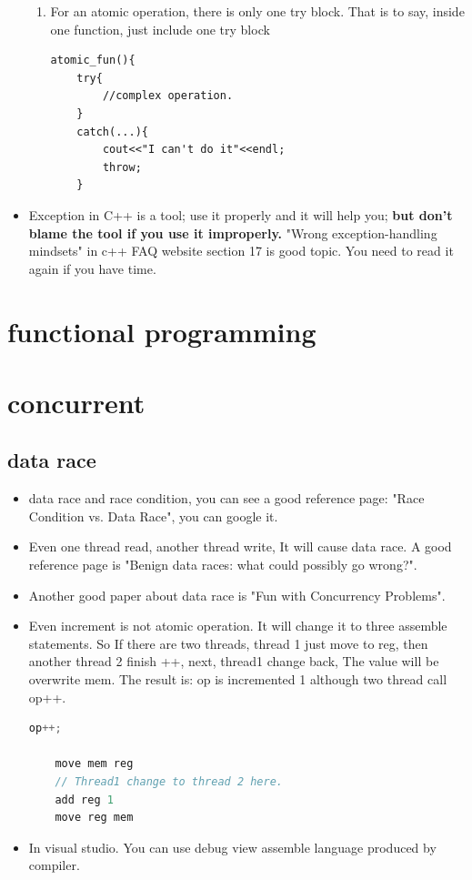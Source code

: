 \documentclass[a4paper,11pt,twoside]{book}
\begin{document}
\begin{itemize}
\begin{enumerate}
		\item For an atomic operation, there is only one try block. That is to say, inside one function, just include one try block
\begin{lstlisting}[numbers=none]
atomic_fun(){
	try{
		//complex operation.
	}
	catch(...){
		cout<<"I can't do it"<<endl;
		throw;
	}
\end{lstlisting}
	\end{enumerate}
	
	\item Exception in C++ is a tool; use it properly and it will help you; \textbf{but don't blame the tool if you use it improperly.} "Wrong exception-handling mindsets" in c++ FAQ website section 17 is good topic. You need to read it again if you have time.
	
\end{itemize}

\chapter{functional programming}

\chapter{concurrent}
\section{data race}
\begin{itemize}
	\item data race and race condition, you can see a good reference page: "Race Condition vs. Data Race", you can google it.
	
	\item Even one thread read, another thread write, It will cause data race. A good reference page is "Benign data races: what could possibly go wrong?". 
	
	\item Another good paper about data race is "Fun with Concurrency Problems".
	
	\item Even increment is not atomic operation. It will change it to three assemble statements. So If there are two threads, thread 1 just move to reg, then another thread 2 finish ++, next, thread1 change back, The value will be overwrite mem. The result is: op is incremented 1 although two thread call op++.
	\begin{lstlisting}[frame=single, language=c++]
	op++;
	
	move mem reg
	// Thread1 change to thread 2 here. 
	add reg 1
	move reg mem
	\end{lstlisting}
	
	\item In visual studio. You can use debug view assemble language produced by compiler. 
\end{itemize}
\end{document}
